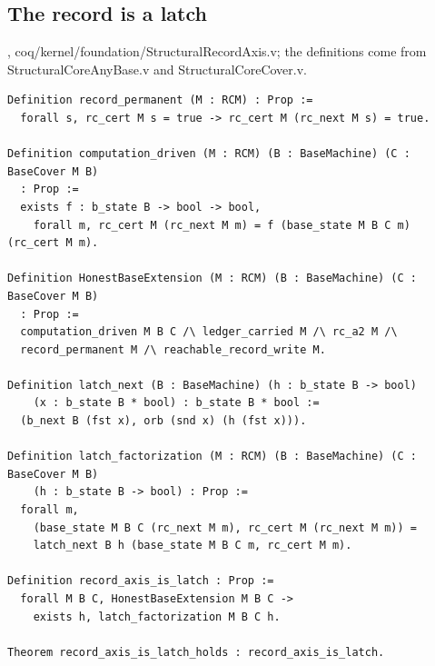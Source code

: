\subsection{The record is a latch}

{\raggedright {}, coq/kernel/foundation/StructuralRecordAxis.v; the definitions come from StructuralCoreAnyBase.v and StructuralCoreCover.v.\par}

{\scriptsize
\begin{verbatim}
Definition record_permanent (M : RCM) : Prop :=
  forall s, rc_cert M s = true -> rc_cert M (rc_next M s) = true.

Definition computation_driven (M : RCM) (B : BaseMachine) (C : BaseCover M B)
  : Prop :=
  exists f : b_state B -> bool -> bool,
    forall m, rc_cert M (rc_next M m) = f (base_state M B C m) (rc_cert M m).

Definition HonestBaseExtension (M : RCM) (B : BaseMachine) (C : BaseCover M B)
  : Prop :=
  computation_driven M B C /\ ledger_carried M /\ rc_a2 M /\
  record_permanent M /\ reachable_record_write M.

Definition latch_next (B : BaseMachine) (h : b_state B -> bool)
    (x : b_state B * bool) : b_state B * bool :=
  (b_next B (fst x), orb (snd x) (h (fst x))).

Definition latch_factorization (M : RCM) (B : BaseMachine) (C : BaseCover M B)
    (h : b_state B -> bool) : Prop :=
  forall m,
    (base_state M B C (rc_next M m), rc_cert M (rc_next M m)) =
    latch_next B h (base_state M B C m, rc_cert M m).

Definition record_axis_is_latch : Prop :=
  forall M B C, HonestBaseExtension M B C ->
    exists h, latch_factorization M B C h.

Theorem record_axis_is_latch_holds : record_axis_is_latch.
\end{verbatim}}

